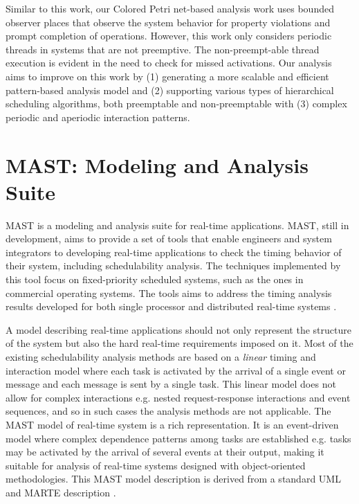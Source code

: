 Similar to this work, our Colored Petri net-based analysis work uses bounded
observer places \cite{Alpern1989} that observe the system behavior for property
violations and prompt completion of operations. However, this work
\cite{kordon2009} only considers periodic threads in systems that are not
preemptive. The non-preempt-able thread execution is evident in the need to
check for missed activations. Our analysis aims to improve on this work by (1)
generating a more scalable and efficient pattern-based analysis model and (2)
supporting various types of hierarchical scheduling algorithms, both preemptable
and non-preemptable with (3) complex periodic and aperiodic interaction
patterns.

\section{MAST: Modeling and Analysis Suite}

MAST \cite{934015} is a modeling and analysis suite for real-time applications.
MAST, still in development, aims to provide a set of tools that enable engineers
and system integrators to developing real-time applications to check the timing
behavior of their system, including schedulability analysis. The techniques
implemented by this tool focus on fixed-priority scheduled systems, such as the
ones in commercial operating systems. The tools aims to address the timing
analysis results developed for both single processor \cite{liu1973scheduling,
klein2012practitioner} and distributed real-time systems
\cite{palencia1999exploiting, tindell1994holistic}.

A model describing real-time applications should not only represent the
structure of the system but also the hard real-time requirements imposed on it.
Most of the existing schedulability analysis methods are based on a
\emph{linear} timing and interaction model where each task is activated by the
arrival of a single event or message and each message is sent by a single task.
This linear model does not allow for complex interactions e.g. nested
request-response interactions and event sequences, and so in such cases the
analysis methods are not applicable. The MAST model of real-time system is a
rich representation. It is an event-driven model where complex dependence
patterns among tasks are established e.g. tasks may be activated by the arrival
of several events at their output, making it suitable for analysis of real-time
systems designed with object-oriented methodologies. This MAST model description
is derived from a standard UML and MARTE description \cite{medina2011}.

